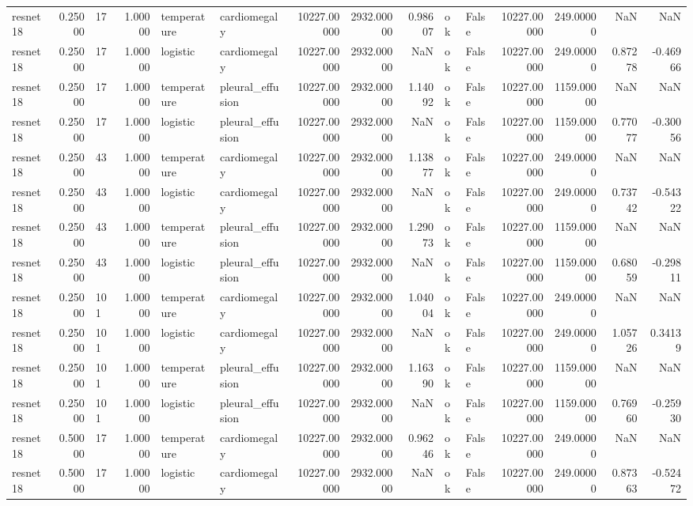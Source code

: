 \begin{tabular}{lrlrllrrrllrrrr}
resnet18 & 0.25000 & 17 & 1.00000 & temperature & cardiomegaly & 10227.00000 & 2932.00000 & 0.98607 & ok & False & 10227.00000 & 249.00000 & NaN & NaN \\
resnet18 & 0.25000 & 17 & 1.00000 & logistic & cardiomegaly & 10227.00000 & 2932.00000 & NaN & ok & False & 10227.00000 & 249.00000 & 0.87278 & -0.46966 \\
resnet18 & 0.25000 & 17 & 1.00000 & temperature & pleural\_effusion & 10227.00000 & 2932.00000 & 1.14092 & ok & False & 10227.00000 & 1159.00000 & NaN & NaN \\
resnet18 & 0.25000 & 17 & 1.00000 & logistic & pleural\_effusion & 10227.00000 & 2932.00000 & NaN & ok & False & 10227.00000 & 1159.00000 & 0.77077 & -0.30056 \\
resnet18 & 0.25000 & 43 & 1.00000 & temperature & cardiomegaly & 10227.00000 & 2932.00000 & 1.13877 & ok & False & 10227.00000 & 249.00000 & NaN & NaN \\
resnet18 & 0.25000 & 43 & 1.00000 & logistic & cardiomegaly & 10227.00000 & 2932.00000 & NaN & ok & False & 10227.00000 & 249.00000 & 0.73742 & -0.54322 \\
resnet18 & 0.25000 & 43 & 1.00000 & temperature & pleural\_effusion & 10227.00000 & 2932.00000 & 1.29073 & ok & False & 10227.00000 & 1159.00000 & NaN & NaN \\
resnet18 & 0.25000 & 43 & 1.00000 & logistic & pleural\_effusion & 10227.00000 & 2932.00000 & NaN & ok & False & 10227.00000 & 1159.00000 & 0.68059 & -0.29811 \\
resnet18 & 0.25000 & 101 & 1.00000 & temperature & cardiomegaly & 10227.00000 & 2932.00000 & 1.04004 & ok & False & 10227.00000 & 249.00000 & NaN & NaN \\
resnet18 & 0.25000 & 101 & 1.00000 & logistic & cardiomegaly & 10227.00000 & 2932.00000 & NaN & ok & False & 10227.00000 & 249.00000 & 1.05726 & 0.34139 \\
resnet18 & 0.25000 & 101 & 1.00000 & temperature & pleural\_effusion & 10227.00000 & 2932.00000 & 1.16390 & ok & False & 10227.00000 & 1159.00000 & NaN & NaN \\
resnet18 & 0.25000 & 101 & 1.00000 & logistic & pleural\_effusion & 10227.00000 & 2932.00000 & NaN & ok & False & 10227.00000 & 1159.00000 & 0.76960 & -0.25930 \\
resnet18 & 0.50000 & 17 & 1.00000 & temperature & cardiomegaly & 10227.00000 & 2932.00000 & 0.96246 & ok & False & 10227.00000 & 249.00000 & NaN & NaN \\
resnet18 & 0.50000 & 17 & 1.00000 & logistic & cardiomegaly & 10227.00000 & 2932.00000 & NaN & ok & False & 10227.00000 & 249.00000 & 0.87363 & -0.52472 \\

\end{tabular}
